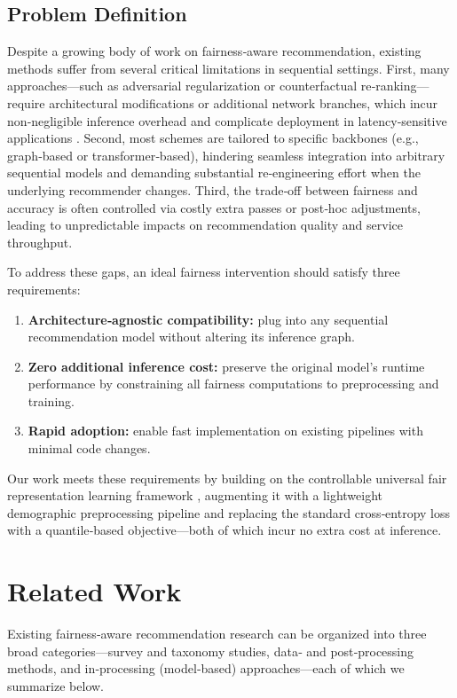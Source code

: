 \documentclass{article}
\begin{document}
\subsection{Problem Definition}
Despite a growing body of work on fairness‐aware recommendation, existing methods suffer from several critical limitations in sequential settings.  First, many approaches—such as adversarial regularization or counterfactual re‐ranking—require architectural modifications or additional network branches, which incur non‐negligible inference overhead and complicate deployment in latency‐sensitive applications \cite{Zhu2023PathSpecific, Wang2024CounterfactualRec}.  
Second, most schemes are tailored to specific backbones (e.g., graph‐based or transformer‐based), hindering seamless integration into arbitrary sequential models and demanding substantial re‐engineering effort when the underlying recommender changes.  
Third, the trade‐off between fairness and accuracy is often controlled via costly extra passes or post‐hoc adjustments, leading to unpredictable impacts on recommendation quality and service throughput.

To address these gaps, an ideal fairness intervention should satisfy three requirements:  
\begin{enumerate}
  \item \textbf{Architecture‐agnostic compatibility:} plug into any sequential recommendation model without altering its inference graph.  
  \item \textbf{Zero additional inference cost:} preserve the original model’s runtime performance by constraining all fairness computations to preprocessing and training.  
  \item \textbf{Rapid adoption:} enable fast implementation on existing pipelines with minimal code changes.
\end{enumerate}
Our work meets these requirements by building on the controllable universal fair representation learning framework \cite{Cui2023ControllableUFRL}, augmenting it with a lightweight demographic preprocessing pipeline and replacing the standard cross‐entropy loss with a quantile‐based objective—both of which incur no extra cost at inference.  


\section{Related Work}
\label{sec:related work}
Existing fairness‐aware recommendation research can be organized into three broad categories—survey and taxonomy studies, data‐ and post‐processing methods, and in‐processing (model‐based) approaches—each of which we summarize below.
\end{document}
